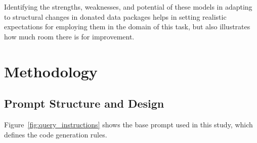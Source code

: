 \documentclass{DESSThesis}
\begin{document}
Identifying the strengths, weaknesses, and potential of these models in adapting to structural changes in donated data packages helps in setting realistic expectations for employing them in the domain of this task, but also illustrates how much room there is for improvement.

\sloppy
{}
\printbibliography

\appendix

\chapter{Methodology}

\section{Prompt Structure and Design}

Figure~\ref{fig:query_instructions} shows the base prompt used in this study, which defines the code generation rules.
\end{document}
